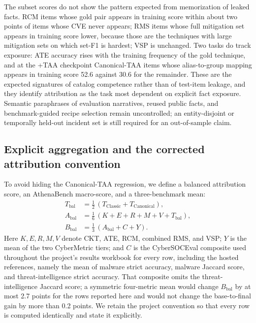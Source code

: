 \documentclass[preprint,12pt,authoryear]{elsarticle}
\newcommand{\Abal}{A_{\mathrm{bal}}}
\newcommand{\Bbal}{B_{\mathrm{bal}}}
\newcommand{\Tbal}{T_{\mathrm{bal}}}
\begin{document}
The subset scores do not show the pattern expected from memorization of leaked facts. RCM items whose gold pair appears in training score within about two points of items whose CVE never appears; RMS items whose full mitigation set appears in training score lower, because those are the techniques with large mitigation sets on which set-F1 is hardest; VSP is unchanged. Two tasks do track exposure: ATE accuracy rises with the training frequency of the gold technique, and at the +TAA checkpoint Canonical-TAA items whose alias-to-group mapping appears in training score 52.6 against 30.6 for the remainder. These are the expected signatures of catalog competence rather than of test-item leakage, and they identify attribution as the task most dependent on explicit fact exposure. Semantic paraphrases of evaluation narratives, reused public facts, and benchmark-guided recipe selection remain uncontrolled; an entity-disjoint or temporally held-out incident set is still required for an out-of-sample claim.

\subsection{Explicit aggregation and the corrected attribution convention}\label{sec:aggregation}
To avoid hiding the Canonical-TAA regression, we define a balanced attribution score, an AthenaBench macro-score, and a three-benchmark mean:
\begin{align}
 \Tbal &= \tfrac12\,(T_{\mathrm{Classic}}+T_{\mathrm{Canonical}}),\\
 \Abal &= \tfrac16\,(K+E+R+M+V+\Tbal),\\
 \Bbal &= \tfrac13\,(\Abal+C+Y).
\end{align}
Here $K,E,R,M,V$ denote CKT, ATE, RCM, combined RMS, and VSP; $Y$ is the mean of the two CyberMetric tiers; and $C$ is the CyberSOCEval composite used throughout the project's results workbook for every row, including the hosted references, namely the mean of malware strict accuracy, malware Jaccard score, and threat-intelligence strict accuracy. That composite omits the threat-intelligence Jaccard score; a symmetric four-metric mean would change $\Bbal$ by at most 2.7 points for the rows reported here and would not change the base-to-final gain by more than 0.2 points. We retain the project convention so that every row is computed identically and state it explicitly.
\end{document}
